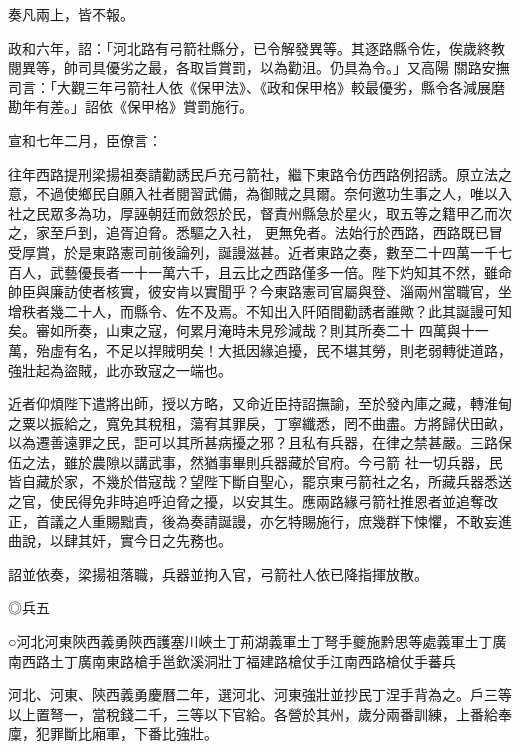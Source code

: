 \begin{pinyinscope}
 奏凡兩上，皆不報。



 政和六年，詔：「河北路有弓箭社縣分，已令解發異等。其逐路縣令佐，俟歲終教閱異等，帥司具優劣之最，各取旨賞罰，以為勸沮。仍具為令。」又高陽
 關路安撫司言：「大觀三年弓箭社人依《保甲法》、《政和保甲格》較最優劣，縣令各減展磨勘年有差。」詔依《保甲格》賞罰施行。



 宣和七年二月，臣僚言：



 往年西路提刑梁揚祖奏請勸誘民戶充弓箭社，繼下東路令仿西路例招誘。原立法之意，不過使鄉民自願入社者閱習武備，為御賊之具爾。奈何邀功生事之人，唯以入社之民眾多為功，厚誣朝廷而斂怨於民，督責州縣急於星火，取五等之籍甲乙而次之，家至戶到，追胥迫脅。悉驅之入社，
 更無免者。法始行於西路，西路既已冒受厚賞，於是東路憲司前後論列，誕謾滋甚。近者東路之奏，數至二十四萬一千七百人，武藝優長者一十一萬六千，且云比之西路僅多一倍。陛下灼知其不然，雖命帥臣與廉訪使者核實，彼安肯以實聞乎？今東路憲司官屬與登、淄兩州當職官，坐增秩者幾二十人，而縣令、佐不及焉。不知出入阡陌間勸誘者誰歟？此其誕謾可知矣。審如所奏，山東之寇，何累月淹時未見殄減哉？則其所奏二十
 四萬與十一萬，殆虛有名，不足以捍賊明矣！大抵因緣追擾，民不堪其勞，則老弱轉徙道路，強壯起為盜賊，此亦致寇之一端也。



 近者仰煩陛下遣將出師，授以方略，又命近臣持詔撫諭，至於發內庫之藏，轉淮甸之粟以振給之，寬免其稅租，蕩宥其罪戾，丁寧纖悉，罔不曲盡。方將歸伏田畝，以為遷善遠罪之民，詎可以其所甚病擾之邪？且私有兵器，在律之禁甚嚴。三路保伍之法，雖於農隙以講武事，然猶事畢則兵器藏於官府。今弓箭
 社一切兵器，民皆自藏於家，不幾於借寇哉？望陛下斷自聖心，罷京東弓箭社之名，所藏兵器悉送之官，使民得免非時追呼迫脅之擾，以安其生。應兩路緣弓箭社推恩者並追奪改正，首議之人重賜黜責，後為奏請誕謾，亦乞特賜施行，庶幾群下悚懼，不敢妄進曲說，以肆其奸，實今日之先務也。



 詔並依奏，梁揚祖落職，兵器並拘入官，弓箭社人依已降指揮放散。


◎兵五



 ○河北河東陝西義勇陝西護塞川峽土丁荊湖義軍土丁弩手夔施黔思等處義軍土丁廣南西路土丁廣南東路槍手邕欽溪洞壯丁福建路槍仗手江南西路槍仗手蕃兵



 河北、河東、陝西義勇慶曆二年，選河北、河東強壯並抄民丁涅手背為之。戶三等以上置弩一，當稅錢二千，三等以下官給。各營於其州，歲分兩番訓練，上番給奉廩，犯罪斷比廂軍，下番比強壯。




\end{pinyinscope}
